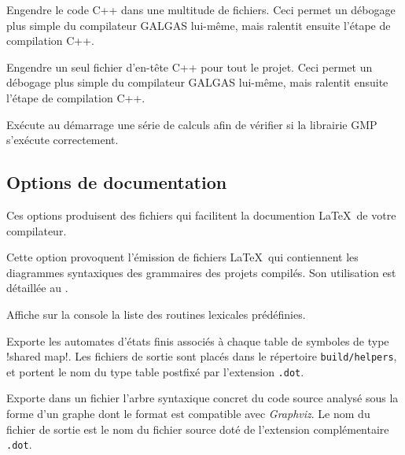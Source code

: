  Engendre le code C++ dans une multitude de fichiers. Ceci permet un débogage plus simple du compilateur GALGAS lui-même, mais ralentit ensuite l'étape de compilation C++.


 Engendre un seul fichier d'en-tête C++ pour tout le projet. Ceci permet un débogage plus simple du compilateur GALGAS lui-même, mais ralentit ensuite l'étape de compilation C++.


 Exécute au démarrage une série de calculs afin de vérifier si la librairie GMP s'exécute correctement.





\subsection{Options de documentation}

Ces options produisent des fichiers qui facilitent la documention \LaTeX~de votre compilateur.

 Cette option provoquent l'émission de fichiers \LaTeX~qui contiennent les diagrammes syntaxiques des grammaires des projets compilés. Son utilisation est détaillée au . %





 Affiche sur la console la liste des routines lexicales prédéfinies.




 Exporte les automates d'états finis associés à chaque table de symboles de type \ggsq!shared map!. Les fichiers de sortie sont placés dans le répertoire \texttt{build/helpers}, et portent le nom du type table postfixé par l'extension \texttt{.dot}.





 Exporte dans un fichier l'arbre syntaxique concret du code source analysé sous la forme d'un graphe dont le format est compatible avec \emph{Graphviz}. Le nom du fichier de sortie est le nom du fichier source doté de l'extension complémentaire \texttt{.dot}.


